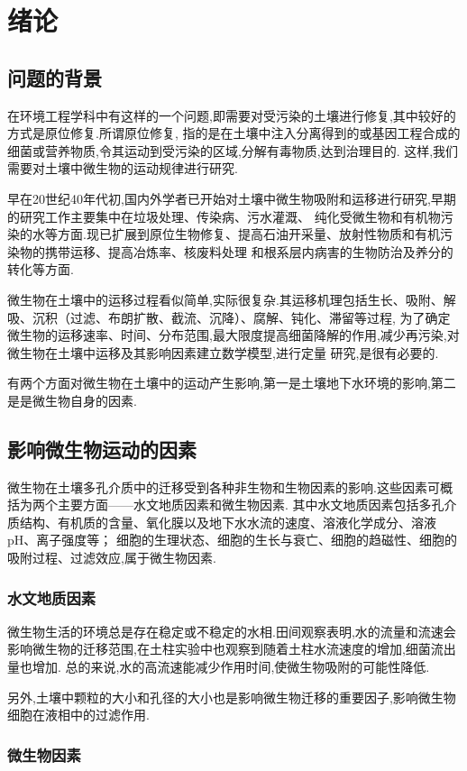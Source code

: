 \chapter{绪论}
\section{问题的背景}
在环境工程学科中有这样的一个问题,即需要对受污染的土壤进行修复,其中较好的方式是原位修复.所谓原位修复,
指的是在土壤中注入分离得到的或基因工程合成的细菌或营养物质,令其运动到受污染的区域,分解有毒物质,达到治理目的.
这样,我们需要对土壤中微生物的运动规律进行研究.\par
早在20世纪40年代初,国内外学者已开始对土壤中微生物吸附和运移进行研究,早期的研究工作主要集中在垃圾处理、传染病、污水灌溉、
纯化受微生物和有机物污染的水等方面.现已扩展到原位生物修复、提高石油开采量、放射性物质和有机污染物的携带运移、提高冶炼率、核废料处理
和根系层内病害的生物防治及养分的转化等方面.\par
微生物在土壤中的运移过程看似简单,实际很复杂.其运移机理包括生长、吸附、解吸、沉积（过滤、布朗扩散、截流、沉降）、腐解、钝化、滞留等过程,
为了确定微生物的运移速率、时间、分布范围,最大限度提高细菌降解的作用,减少再污染,对微生物在土壤中运移及其影响因素建立数学模型,进行定量
研究,是很有必要的.\par
有两个方面对微生物在土壤中的运动产生影响,第一是土壤地下水环境的影响,第二是是微生物自身的因素.
\section{影响微生物运动的因素}
微生物在土壤多孔介质中的迁移受到各种非生物和生物因素的影响.这些因素可概括为两个主要方面——水文地质因素和微生物因素.
其中水文地质因素包括多孔介质结构、有机质的含量、氧化膜以及地下水水流的速度、溶液化学成分、溶液pH、离子强度等；
细胞的生理状态、细胞的生长与衰亡、细胞的趋磁性、细胞的吸附过程、过滤效应,属于微生物因素.
\subsection{水文地质因素}
微生物生活的环境总是存在稳定或不稳定的水相.田间观察表明,水的流量和流速会影响微生物的迁移范围,在土柱实验中也观察到随着土柱水流速度的增加,细菌流出量也增加.
总的来说,水的高流速能减少作用时间,使微生物吸附的可能性降低.\par
另外,土壤中颗粒的大小和孔径的大小也是影响微生物迁移的重要因子,影响微生物细胞在液相中的过滤作用.
\subsection{微生物因素}
